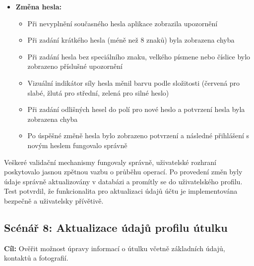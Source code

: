 \documentclass[czech, bp, kiv, he, iso690numb, pdf]{fasthesis}
\begin{document}
\begin{itemize}
        \item \textbf{Změna hesla:}
        \begin{itemize}
            \item Při nevyplnění současného hesla aplikace zobrazila upozornění 
            \item Při zadání krátkého hesla (méně než 8 znaků) byla zobrazena chyba 
            \item Při zadání hesla bez speciálního znaku, velkého písmene nebo číslice bylo zobrazeno příslušné upozornění
            \item Vizuální indikátor síly hesla měnil barvu podle složitosti (červená pro slabé, žlutá pro střední, zelená pro silné heslo)
            \item Při zadání odlišných hesel do polí pro nové heslo a potvrzení hesla byla zobrazena chyba 
            \item Po úspěšné změně hesla bylo zobrazeno potvrzení a následné přihlášení s novým heslem fungovalo správně
        \end{itemize}
    \end{itemize}

    Veškeré validační mechanismy fungovaly správně, uživatelské rozhraní poskytovalo jasnou zpětnou vazbu o průběhu operací. Po provedení změn byly údaje správně aktualizovány v databázi a promítly se do uživatelského profilu. Test potvrdil, že funkcionalita pro aktualizaci údajů účtu je implementována bezpečně a uživatelsky přívětivě.





    \subsection*{Scénář 8: Aktualizace údajů profilu útulku}

    \textbf{Cíl:} Ověřit možnost úpravy informací o útulku včetně základních údajů, kontaktů a fotografií.\\
\end{document}
